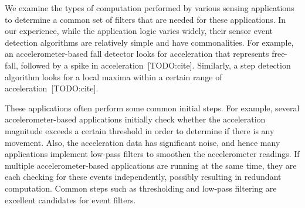 We examine the types of computation performed by various sensing applications to
determine a common set of filters that are needed for these applications. In our
experience, while the application logic varies widely, their sensor event
detection algorithms are relatively simple and have commonalities. For example,
an accelerometer-based fall detector looks for acceleration that represents
free-fall, followed by a spike in acceleration~[TODO:cite]. Similarly, a step
detection algorithm looks for a local maxima within a certain range of
acceleration~[TODO:cite]. 

These applications often perform some common initial steps. For example, several
accelerometer-based applications initially check whether the acceleration
magnitude exceeds a certain threshold in order to determine if there is any
movement. Also, the acceleration data has significant noise, and hence many
applications implement low-pass filters to smoothen the accelerometer readings.
If multiple accelerometer-based applications are running at the same time, they
are each checking for these events independently, possibly resulting in
redundant computation. Common steps such as thresholding and low-pass filtering
are excellent candidates for event filters.

